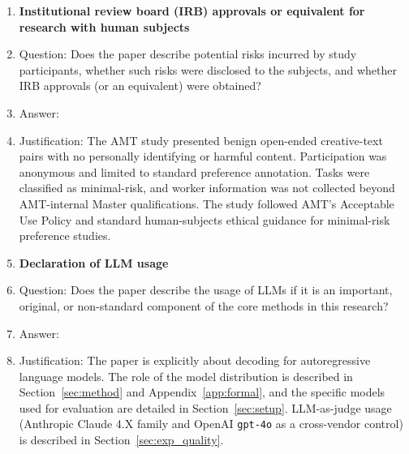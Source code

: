 \documentclass{article}
\begin{document}
\begin{enumerate}
\item {\bf Institutional review board (IRB) approvals or equivalent for research with human subjects}
    \item[] Question: Does the paper describe potential risks incurred by study participants, whether such risks were disclosed to the subjects, and whether IRB approvals (or an equivalent) were obtained?
    \item[] Answer: \answerYes{}
    \item[] Justification: The AMT study presented benign open-ended creative-text pairs with no personally identifying or harmful content. Participation was anonymous and limited to standard preference annotation. Tasks were classified as minimal-risk, and worker information was not collected beyond AMT-internal Master qualifications. The study followed AMT's Acceptable Use Policy and standard human-subjects ethical guidance for minimal-risk preference studies.

\item {\bf Declaration of LLM usage}
    \item[] Question: Does the paper describe the usage of LLMs if it is an important, original, or non-standard component of the core methods in this research?
    \item[] Answer: \answerYes{}
    \item[] Justification: The paper is explicitly about decoding for autoregressive language models. The role of the model distribution is described in Section~\ref{sec:method} and Appendix~\ref{app:formal}, and the specific models used for evaluation are detailed in Section~\ref{sec:setup}. LLM-as-judge usage (Anthropic Claude 4.X family and OpenAI \texttt{gpt-4o} as a cross-vendor control) is described in Section~\ref{sec:exp_quality}.

\end{enumerate}
\end{document}
